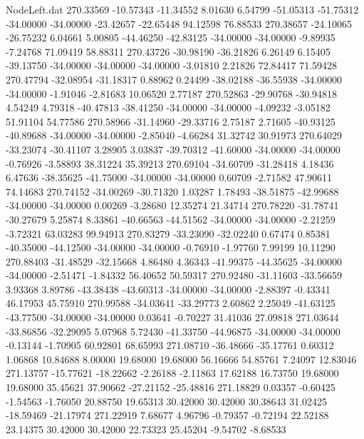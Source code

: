 \begin{filecontents}{NodeLeft.dat}
 270.33569  -10.57343  -11.34552     8.01630    6.54799  -51.05313  -51.75312  -34.00000  -34.00000  -23.42657  -22.65448   94.12598   76.88533
 270.38657  -24.10065  -26.75232     6.04661    5.00805  -44.46250  -42.83125  -34.00000  -34.00000   -9.89935   -7.24768   71.09419   58.88311
 270.43726  -30.98190  -36.21826     6.26149    6.15405  -39.13750  -34.00000  -34.00000  -34.00000   -3.01810    2.21826   72.84417   71.59428
 270.47794  -32.08954  -31.18317     0.88962    0.24499  -38.02188  -36.55938  -34.00000  -34.00000   -1.91046   -2.81683   10.06520    2.77187
 270.52863  -29.90768  -30.94818     4.54249    4.79318  -40.47813  -38.41250  -34.00000  -34.00000   -4.09232   -3.05182   51.91104   54.77586
 270.58966  -31.14960  -29.33716     2.75187    2.71605  -40.93125  -40.89688  -34.00000  -34.00000   -2.85040   -4.66284   31.32742   30.91973
 270.64029  -33.23074  -30.41107     3.28905    3.03837  -39.70312  -41.60000  -34.00000  -34.00000   -0.76926   -3.58893   38.31224   35.39213
 270.69104  -34.60709  -31.28418     4.18436    6.47636  -38.35625  -41.75000  -34.00000  -34.00000    0.60709   -2.71582   47.90611   74.14683
 270.74152  -34.00269  -30.71320     1.03287    1.78493  -38.51875  -42.99688  -34.00000  -34.00000    0.00269   -3.28680   12.35274   21.34714
 270.78220  -31.78741  -30.27679     5.25874    8.33861  -40.66563  -44.51562  -34.00000  -34.00000   -2.21259   -3.72321   63.03283   99.94913
 270.83279  -33.23090  -32.02240     0.67474    0.85381  -40.35000  -44.12500  -34.00000  -34.00000   -0.76910   -1.97760    7.99199   10.11290
 270.88403  -31.48529  -32.15668     4.86480    4.36343  -41.99375  -44.35625  -34.00000  -34.00000   -2.51471   -1.84332   56.40652   50.59317
 270.92480  -31.11603  -33.56659     3.93368    3.89786  -43.38438  -43.60313  -34.00000  -34.00000   -2.88397   -0.43341   46.17953   45.75910
 270.99588  -34.03641  -33.29773     2.60862    2.25049  -41.63125  -43.77500  -34.00000  -34.00000    0.03641   -0.70227   31.41036   27.09818
 271.03644  -33.86856  -32.29095     5.07968    5.72430  -41.33750  -44.96875  -34.00000  -34.00000   -0.13144   -1.70905   60.92801   68.65993
 271.08710  -36.48666  -35.17761     0.60312    1.06868   10.84688    8.00000   19.68000   19.68000   56.16666   54.85761    7.24097   12.83046
 271.13757  -15.77621  -18.22662    -2.26188   -2.11863   17.62188   16.73750   19.68000   19.68000   35.45621   37.90662  -27.21152  -25.48816
 271.18829    0.03357   -0.60425    -1.54563   -1.76050   20.88750   19.65313   30.42000   30.42000   30.38643   31.02425  -18.59469  -21.17974
 271.22919    7.68677    4.96796    -0.79357   -0.72194   22.52188   23.14375   30.42000   30.42000   22.73323   25.45204   -9.54702   -8.68533

\end{filecontents}
